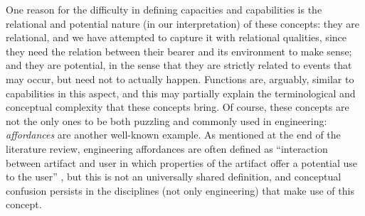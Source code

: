 \documentclass[sw]{iosart2x}
\newcommand{\BFO}{\textsc{BFO}\xspace}
\newcommand{\quotes}[1]{`#1'}
\newcommand{\qquotes}[1]{``#1''}
\newcommand{\myComment}[1]{{\unskip \ignorespaces}}
\begin{document}
One reason for the difficulty in defining capacities and capabilities is the relational and potential nature (in our interpretation) of these concepts: they are relational, and we have attempted to capture it with relational qualities, since they need the relation between their bearer and its environment to make sense; and they are potential, in the sense that they are strictly related to events that may occur, but need not to actually happen.
Functions are, arguably, similar to capabilities in this aspect, 
and this may partially explain the terminological and conceptual complexity that these concepts bring. 
Of course, these concepts are not the only ones to be both puzzling and commonly used in engineering: \textit{affordances} are another well-known example. 
As mentioned at the end of the literature review, engineering affordances are often defined as \qquotes{interaction between artifact and user in which properties of the artifact offer a potential use to the user} \cite{maierAffordanceBasedDesign2009}, but this is not an universally shared definition, and conceptual confusion persists in the disciplines (not only engineering) that make use of this concept.
\end{document}
